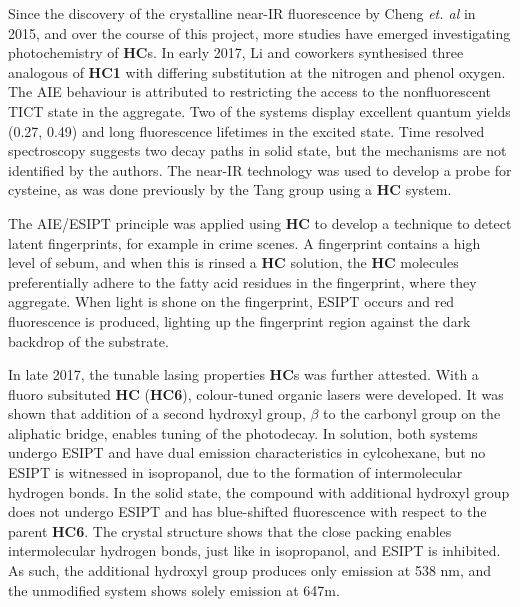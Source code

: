 Since the discovery of the crystalline near-IR fluorescence by Cheng \textit{et. al} in 2015, and over the course of this project, more studies have emerged investigating photochemistry of \textbf{HC}s. %
In early 2017, Li and coworkers synthesised three analogous of \textbf{HC1} with differing substitution at the nitrogen and phenol oxygen.\cite{Li2017a} The AIE behaviour is attributed to restricting the access to the nonfluorescent \ac{TICT} state in the aggregate. Two of the systems display excellent quantum yields (0.27, 0.49) and long fluorescence lifetimes in the excited state. Time resolved spectroscopy suggests two decay paths in solid state, but the mechanisms are not identified by the authors. The near-IR technology was used to develop a probe for cysteine, as was done previously by the Tang group using a \textbf{HC} system.\cite{Song2014} 

The \ac{AIE}/\ac{ESIPT} principle was applied using \textbf{HC} to develop a technique to detect latent fingerprints, for example in crime scenes.\cite{Jin2015} A fingerprint contains a high level of sebum, and when this is rinsed a \textbf{HC} solution, the \textbf{HC} molecules preferentially adhere to the fatty acid residues in the fingerprint, where they aggregate. When light is shone on the fingerprint, \ac{ESIPT} occurs and red fluorescence is produced, lighting up the fingerprint region against the dark backdrop of the substrate.  

In late 2017, the tunable lasing properties \textbf{HC}s was further attested.\cite{Li2017d} With a fluoro subsituted \textbf{HC} (\textbf{HC6}), colour-tuned organic lasers were developed. It was shown that addition of a second hydroxyl group, $\beta$ to the carbonyl group on the aliphatic bridge, enables tuning of the photodecay. In solution, both systems undergo ESIPT and have dual emission characteristics in cylcohexane, but no ESIPT is witnessed in isopropanol, due to the formation of intermolecular hydrogen bonds. In the solid state, the compound with additional hydroxyl group does not undergo ESIPT and has blue-shifted fluorescence with respect to the parent \textbf{HC6}. The crystal structure shows that the close packing enables intermolecular hydrogen bonds, just like in isopropanol, and ESIPT is inhibited. As such, the additional hydroxyl group produces only \Estar{} emission at 538 nm, and the unmodified system shows solely \Kstar{} emission at 647m. 

